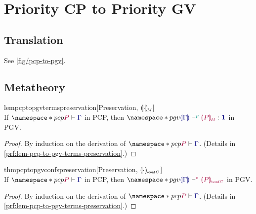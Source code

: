 \documentclass[main.tex]{subfiles}
\begin{document}
\section{Priority CP to Priority GV}

\subsection{Translation}

See \cref{fig/pcp-to-pgv}.

\subsection{Metatheory}

\begin{restatablelemma}{lempcptopgvtermspreservation}[Preservation, $\llparenthesis\cdot\rrparenthesis_{\!\scriptscriptstyle{M}}$]
  \label{lem:pcp-to-pgv-terms-preservation}
  \hfill\\%
  If $\pcp{\seq{P}{\ty{\Gamma}}}$ in PCP,
  then $\pgv{\tseq[\cs{p}]{\ty{\cpgvT{\Gamma}}}{\cpgvM{P}}{\tyunit}}$ in PGV.
\end{restatablelemma}
\begin{proof}
  By induction on the derivation of $\pcp{\seq{P}{\ty{\Gamma}}}$.
  (Details in \cref{prf:lem-pcp-to-pgv-terms-preservation}.)
\end{proof}

\begin{restatabletheorem}{thmpcptopgvconfspreservation}[Preservation, $\cpgvC{\cdot}$]
  \label{thm:pcp-to-pgv-confs-preservation}
  \hfill\\%
  If $\pcp{\seq{P}{\ty{\Gamma}}}$ in PCP,
  then $\pgv{\cseq[\child]{\ty{\cpgvT{\Gamma}}}{\cpgvC{P}}}$ in PGV.
\end{restatabletheorem}
\begin{proof}
  By induction on the derivation of $\pcp{\seq{P}{\ty{\Gamma}}}$.
  (Details in \cref{prf:lem-pcp-to-pgv-terms-preservation}.)
\end{proof}
\end{document}
